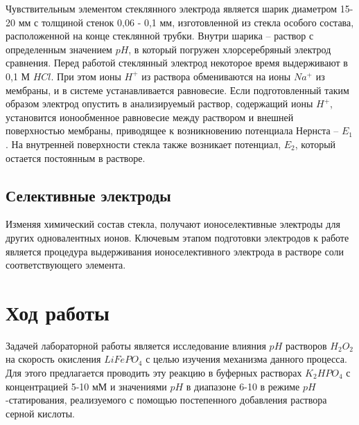 \documentclass[a4paper,12pt]{article} %
\begin{document}
Чувствительным элементом стеклянного электрода является шарик диаметром 15-20 мм с толщиной стенок 0,06 - 0,1 мм, изготовленной из стекла особого состава, расположенной на конце стеклянной трубки. Внутри шарика – раствор с определенным значением $pH$, в который погружен хлорсеребряный электрод сравнения. Перед работой стеклянный электрод некоторое время выдерживают в 0,1 М $HCl$. При этом ионы $H^{+}$ из раствора обмениваются на ионы $Na^{+}$ из мембраны, и в системе устанавливается равновесие. Если подготовленный таким образом электрод опустить в анализируемый раствор, содержащий ионы $H^+$, установится ионообменное равновесие между раствором и внешней поверхностью мембраны, приводящее к возникновению потенциала Нернста –  $E_1$. На внутренней поверхности стекла также возникает потенциал, $E_2$, который остается постоянным в растворе.

\subsection{Селективные электроды}
Изменяя химический состав стекла, получают ионоселективные электроды для других одновалентных ионов. Ключевым этапом подготовки электродов к работе является процедура выдерживания ионоселективного электрода в растворе соли соответствующего элемента. 

\section{Ход работы}

Задачей лабораторной работы является исследование влияния $pH$ растворов $H_2O_2$ на скорость окисления $LiFePO_4$ с целью изучения механизма данного процесса. Для этого предлагается проводить эту реакцию в буферных растворах $K_2HPO_4$ с концентрацией 5-10 мМ и значениями $pH$ в диапазоне 6-10 в режиме $pH$-статирования, реализуемого с помощью постепенного добавления раствора серной кислоты. 
\end{document}
